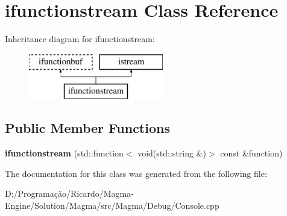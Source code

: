 \hypertarget{classifunctionstream}{}\section{ifunctionstream Class Reference}
\label{classifunctionstream}
Inheritance diagram for ifunctionstream\+:\begin{figure}[H]
\begin{center}
\leavevmode
\includegraphics[height=2.000000cm]{classifunctionstream}
\end{center}
\end{figure}
\subsection*{Public Member Functions}
\begin{DoxyCompactItemize}
\item 
\mbox{\label{classifunctionstream_ac41a505da4c3feef9bf26692dda6728e}} 
{\bfseries ifunctionstream} (std\+::function$<$ void(std\+::string \&)$>$ const \&function)
\end{DoxyCompactItemize}


The documentation for this class was generated from the following file\+:\begin{DoxyCompactItemize}
\item 
D\+:/\+Programação/\+Ricardo/\+Magma-\/\+Engine/\+Solution/\+Magma/src/\+Magma/\+Debug/Console.\+cpp\end{DoxyCompactItemize}

